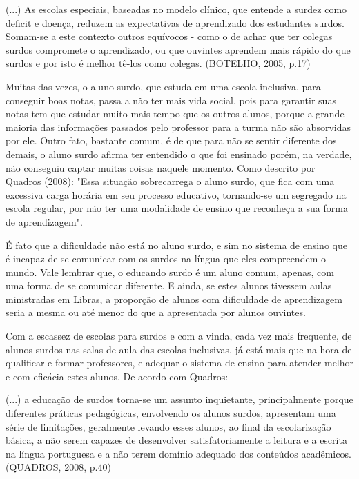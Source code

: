 \documentclass[brasil]{abnt}
\begin{document}
		\begin{citacao}(...) As escolas especiais, baseadas no modelo clínico, que entende a surdez como deficit e doença, reduzem as expectativas de aprendizado dos 
						estudantes surdos. Somam-se a este contexto outros equívocos - como o de achar que ter colegas surdos compromete o aprendizado, ou que ouvintes 
						aprendem mais rápido do que surdos e por isto é melhor tê-los como colegas. (BOTELHO, 2005, p.17)
		\end{citacao}
	
	Muitas das vezes, o aluno surdo, que estuda em uma escola inclusiva, para conseguir boas notas, passa a não ter mais vida social, pois para garantir suas notas tem que estudar
	muito mais tempo que os outros alunos, porque a grande maioria das informações passados pelo professor para a turma não são absorvidas por ele. Outro fato, bastante comum, é
	de que para não se sentir diferente dos demais, o aluno surdo afirma ter entendido o que foi ensinado porém, na verdade, não conseguiu captar muitas coisas naquele momento.
	Como descrito por Quadros (2008): "Essa situação sobrecarrega o aluno surdo, que fica com uma excessiva carga horária em seu processo educativo, tornando-se um segregado na 
	escola regular, por não ter uma modalidade de ensino que reconheça a sua forma de aprendizagem". 
	
	É fato que a dificuldade não está no aluno surdo, e sim no sistema de ensino que é incapaz de se comunicar com os surdos na língua que eles compreendem o mundo. Vale lembrar que, 
	o educando surdo é um aluno comum, apenas, com uma forma de se comunicar diferente. E ainda, se estes alunos tivessem aulas ministradas em Libras, a proporção de alunos com dificuldade 
	de aprendizagem seria a mesma ou até menor do que a apresentada por alunos ouvintes.
	
	Com a escassez de escolas para surdos e com a vinda, cada vez mais frequente, de alunos surdos nas salas de aula das escolas inclusivas, já está mais que na hora de 
	qualificar e formar professores, e adequar o sistema de ensino para atender melhor e com eficácia estes alunos. De acordo com Quadros:
	
		\begin{citacao}(...) a educação de surdos torna-se um assunto inquietante, principalmente porque diferentes práticas pedagógicas, envolvendo os alunos surdos, apresentam
						uma série de limitações, geralmente levando esses alunos, ao final da escolarização básica, a não serem capazes de desenvolver satisfatoriamente a leitura 
						e a escrita na língua portuguesa e a não terem domínio adequado dos conteúdos acadêmicos. (QUADROS, 2008, p.40)
		\end{citacao}
	
\end{document}
